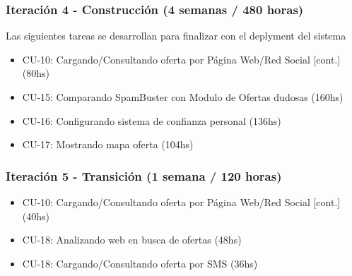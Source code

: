 \subsubsection{Iteraci\'on 4 - Construcci\'on (4 semanas / 480 horas)}
	
	Las siguientes tareas se desarrollan para finalizar con el deplyment del sistema
	
	\begin{itemize}
		  \item CU-10: Cargando/Consultando oferta por P\'agina Web/Red Social [cont.] (80hs)
		  \item CU-15: Comparando SpamBuster con Modulo de Ofertas dudosas (160hs)
		  \item CU-16: Configurando sistema de confianza personal (136hs)
		  \item CU-17: Mostrando mapa oferta (104hs)
	\end{itemize}

\subsubsection{Iteraci\'on 5 - Transici\'on (1 semana / 120 horas)}
	
	\begin{itemize}
		  \item CU-10: Cargando/Consultando oferta por P\'agina Web/Red Social [cont.] (40hs)
		  \item CU-18: Analizando web en busca de ofertas (48hs)
		  \item CU-18: Cargando/Consultando oferta por SMS (36hs)
	\end{itemize}
